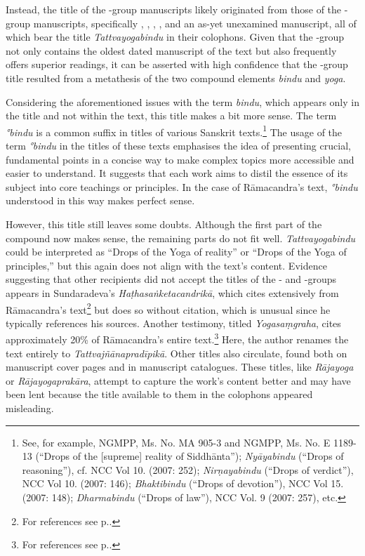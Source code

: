 Instead, the title of the \beta-group manuscripts likely originated from those of the \alpha-group manuscripts, specifically , , , , and an as-yet unexamined manuscript, all of which bear the title \emph{Tattvayogabindu} in their colophons. Given that the \alpha-group not only contains the oldest dated manuscript of the text but also frequently offers superior readings, it can be asserted with high confidence that the \beta-group title resulted from a metathesis of the two compound elements \textit{bindu} and \textit{yoga}.

Considering the aforementioned issues with the term \textit{bindu}, which appears only in the title and not within the text, this title makes a bit more sense. The term \textit{°bindu} is a common suffix in titles of various Sanskrit texts.\footnote{See, for example, \nocite{stb2} NGMPP, Ms. No. MA 905-3 and NGMPP, Ms. No. E 1189-13 (``Drops of the [supreme] reality of Siddhānta''); \emph{Nyāyabindu} (``Drops of reasoning''), cf. \nocite{newcataloguscatalogorum10} NCC Vol 10. (2007: 252); \emph{Nirṇayabindu} (``Drops of verdict''), NCC Vol 10. (2007: 146); \emph{Bhaktibindu} (``Drops of devotion''), NCC Vol 15. (2007: 148); \emph{Dharmabindu} (``Drops of law''), NCC Vol. 9 (2007: 257), etc.\nocite{newcataloguscatalogorum9}\nocite{newcataloguscatalogorum15}} The usage of the term \textit{°bindu} in the titles of these texts emphasises the idea of presenting crucial, fundamental points in a concise way to make complex topics more accessible and easier to understand. It suggests that each work aims to distil the essence of its subject into core teachings or principles. In the case of Rāmacandra's text, \textit{°bindu} understood in this way makes perfect sense.     

However, this title still leaves some doubts. Although the first part of the compound now makes sense, the remaining parts do not fit well. \emph{Tattvayogabindu} could be interpreted as ``Drops of the Yoga of reality'' or ``Drops of the Yoga of principles,'' but this again does not align with the text's content. Evidence suggesting that other recipients did not accept the titles of the \alpha- and \beta-groups appears in Sundaradeva's \emph{Haṭhasaṅketacandrikā}, which cites extensively from Rāmacandra's text\footnote{For references see p.\pageref{hathacandrika}.} but does so without citation, which is unusual since he typically references his sources. Another testimony, titled \emph{Yogasaṃgraha}, cites approximately 20\% of Rāmacandra's entire text.\footnote{For references see p.\pageref{yogasamgraha}.} Here, the author renames the text entirely to \emph{Tattvajñānapradīpikā}. Other titles also circulate, found both on manuscript cover pages and in manuscript catalogues. These titles, like \emph{Rājayoga} or \emph{Rājayogaprakāra}, attempt to capture the work's content better and may have been lent because the title available to them in the colophons appeared misleading. 

